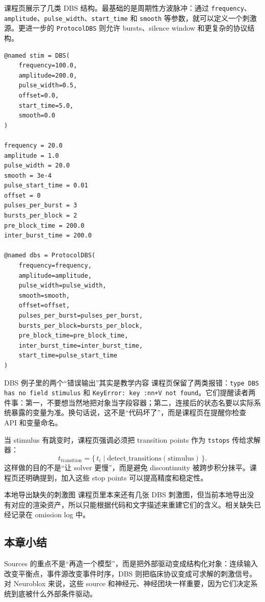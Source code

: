\documentclass[a4paper]{article}
\begin{document}
课程页展示了几类 DBS 结构。最基础的是周期性方波脉冲：通过 \texttt{frequency}、\texttt{amplitude}、\texttt{pulse\_width}、\texttt{start\_time} 和 \texttt{smooth} 等参数，就可以定义一个刺激源。更进一步的 \texttt{ProtocolDBS} 则允许 bursts、silence window 和更复杂的协议结构。

\begin{lstlisting}[caption={DBS 与 ProtocolDBS 的参数化思路。},label={lst:dbs}]
@named stim = DBS(
    frequency=100.0,
    amplitude=200.0,
    pulse_width=0.5,
    offset=0.0,
    start_time=5.0,
    smooth=0.0
)

frequency = 20.0
amplitude = 1.0
pulse_width = 20.0
smooth = 3e-4
pulse_start_time = 0.01
offset = 0
pulses_per_burst = 3
bursts_per_block = 2
pre_block_time = 200.0
inter_burst_time = 200.0

@named dbs = ProtocolDBS(
    frequency=frequency,
    amplitude=amplitude,
    pulse_width=pulse_width,
    smooth=smooth,
    offset=offset,
    pulses_per_burst=pulses_per_burst,
    bursts_per_block=bursts_per_block,
    pre_block_time=pre_block_time,
    inter_burst_time=inter_burst_time,
    start_time=pulse_start_time
)
\end{lstlisting}

\begin{warningbox}{DBS 例子里的两个“错误输出”其实是教学内容}
课程页保留了两类报错：\texttt{type DBS has no field stimulus} 和 \texttt{KeyError: key :nn+V not found}。它们提醒读者两件事：第一，不要想当然地把对象当字段容器；第二，连接后的状态名要以实际系统暴露的变量为准。换句话说，这不是“代码坏了”，而是课程页在提醒你检查 API 和变量命名。
\end{warningbox}

当 stimulus 有跳变时，课程页强调必须把 transition points 作为 \texttt{tstops} 传给求解器：
\[
t_{\mathrm{transition}} = \{\, t_i \mid \text{detect\_transitions}(\text{stimulus}) \,\}.
\]
这样做的目的不是“让 solver 更慢”，而是避免 discontinuity 被跨步积分抹平。课程页还明确提到，加入这些 stop points 可以提高精度和稳定性。

\begin{warningbox}{本地导出缺失的刺激图}
课程页里本来还有几张 DBS 刺激图，但当前本地导出没有对应的渲染资产，所以只能根据代码和文字描述来重建它们的含义。相关缺失已经记录在 omission log 中。
\end{warningbox}

\subsection{本章小结}
Sources 的重点不是“再造一个模型”，而是把外部驱动变成结构化对象：连续输入改变平衡点，事件源改变事件时序，DBS 则把临床协议变成可求解的刺激信号。对 Neuroblox 来说，这些 source 和神经元、神经团块一样重要，因为它们决定系统到底被什么外部条件驱动。
\end{document}
